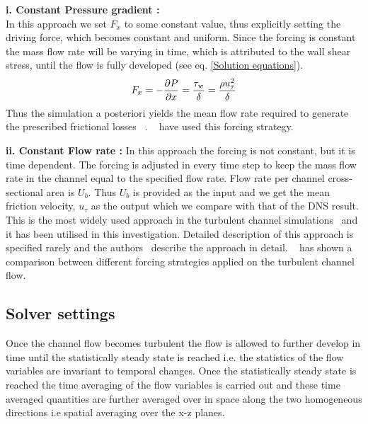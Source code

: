 \textbf{i. Constant Pressure gradient :}\\ In this approach we set $F_x$ to some constant value, thus explicitly setting the driving force, which becomes constant and uniform. 
Since the forcing is constant the mass flow rate will be varying in time, which is attributed to the wall shear stress, until the flow is fully developed (see eq. \ref{Solution equations}).
%
\begin{equation}
\label{CPG}
F_x = -\frac{\partial P}{\partial x} = \frac{\tau_w}{\delta} = \frac{\rho u_\tau^2}{\delta}
\end{equation}
%
Thus the simulation a posteriori yields the mean flow rate required to generate the prescribed frictional losses ~\cite{Quadrioa:15}. ~\cite{KPremnath:09, Freitas:11} have used this forcing strategy.

\textbf{ii. Constant Flow rate :} In this approach the forcing is not constant, but it is time dependent. The forcing is adjusted in every time step to keep the mass flow rate in the channel equal to the specified flow rate. Flow rate per channel cross-sectional area is $U_b$. Thus $U_b$ is provided as the input and we get the mean friction velocity, $u_\tau$ as the output which we compare with that of the DNS result. This is the most widely used approach in the turbulent channel simulations~\cite{devilliers:phd, sonja:12, roos:book} and it has been utilised in this investigation. Detailed description of this approach is specified rarely and the authors~\cite{Quadrioa:15, Lenormanda:00} describe the approach in detail. ~\cite{Quadrioa:15} has shown a comparison between different forcing strategies applied on the turbulent channel flow.

\subsection{Solver settings}
Once the channel flow becomes turbulent the flow is allowed to further develop in time until the statistically steady state is reached i.e. the statistics of the flow variables are invariant to temporal changes. Once the statistically steady state is reached the time averaging of the flow variables is carried out and these time averaged quantities are further averaged over in space along the two homogeneous directions i.e spatial averaging over the x-z planes. 

